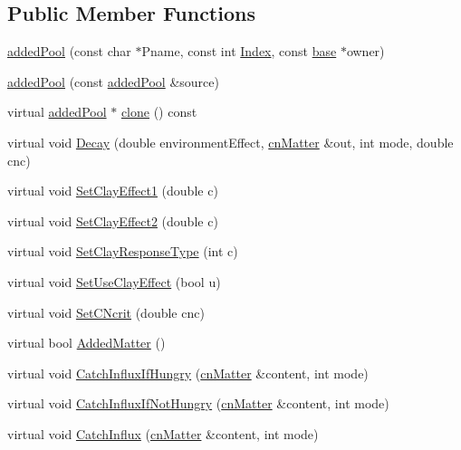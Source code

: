 \subsection*{Public Member Functions}
\begin{DoxyCompactItemize}
\item 
\hyperlink{classadded_pool_a13b5f518f801321e531672b6b03309d2}{addedPool} (const char $\ast$Pname, const int \hyperlink{classbase_afa59aaa1a0201700640234eb13a03aae}{Index}, const \hyperlink{classbase}{base} $\ast$owner)
\item 
\hyperlink{classadded_pool_ab5c337742c93f028dc93b7428647aa01}{addedPool} (const \hyperlink{classadded_pool}{addedPool} \&source)
\item 
virtual \hyperlink{classadded_pool}{addedPool} $\ast$ \hyperlink{classadded_pool_a6841609f3de8ac7a775bbd915eeaefdb}{clone} () const 
\item 
virtual void \hyperlink{classadded_pool_a6bc59f070b765a1fbbb1d24d17882b33}{Decay} (double environmentEffect, \hyperlink{classcn_matter}{cnMatter} \&out, int mode, double cnc)
\item 
virtual void \hyperlink{classadded_pool_a1ef97d19e864d5424801ef2cbab85bc2}{SetClayEffect1} (double c)
\item 
virtual void \hyperlink{classadded_pool_ae72c1de15194151dcc6fbc2b29e6c7d3}{SetClayEffect2} (double c)
\item 
virtual void \hyperlink{classadded_pool_a467e82b7fa7d7be8a8b72b3f0971a0c1}{SetClayResponseType} (int c)
\item 
virtual void \hyperlink{classadded_pool_ae255afcab8b53ec6761e69b2d42e772d}{SetUseClayEffect} (bool u)
\item 
virtual void \hyperlink{classadded_pool_ae44b05bd5c582fc559ea3713ce6ae828}{SetCNcrit} (double cnc)
\item 
virtual bool \hyperlink{classadded_pool_a0bc16d307ad2493bc2765fee91ebd4a0}{AddedMatter} ()
\item 
virtual void \hyperlink{classadded_pool_afbd54d1de5f10317e091a58e46be0ce3}{CatchInfluxIfHungry} (\hyperlink{classcn_matter}{cnMatter} \&content, int mode)
\item 
virtual void \hyperlink{classadded_pool_abe54b048d58a11fda014be4710031f56}{CatchInfluxIfNotHungry} (\hyperlink{classcn_matter}{cnMatter} \&content, int mode)
\item 
virtual void \hyperlink{classadded_pool_a67faed29b7b9d747de144920d7299a71}{CatchInflux} (\hyperlink{classcn_matter}{cnMatter} \&content, int mode)
\item 

\end{DoxyCompactItemize}
